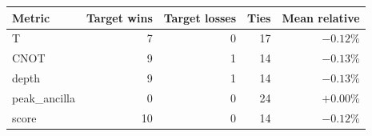 \begin{tabular}{lrrrr}
\toprule
Metric & Target wins & Target losses & Ties & Mean relative \\
\midrule
T & 7 & 0 & 17 & $-0.12\%$ \\
CNOT & 9 & 1 & 14 & $-0.13\%$ \\
depth & 9 & 1 & 14 & $-0.13\%$ \\
peak_ancilla & 0 & 0 & 24 & $+0.00\%$ \\
score & 10 & 0 & 14 & $-0.12\%$ \\
\bottomrule
\end{tabular}

